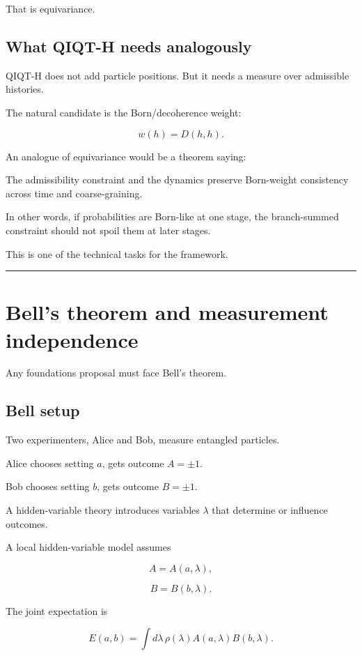 \documentclass[11pt,a4paper]{article}
\newenvironment{qiqtquote}{\begin{mdframed}[style=quotestyle]}{\end{mdframed}}
\begin{document}
That is equivariance.

\subsection{What QIQT-H needs analogously}

QIQT-H does not add particle positions. But it needs a measure over admissible histories.

The natural candidate is the Born/decoherence weight:

\[
w(h)=D(h,h).
\]

An analogue of equivariance would be a theorem saying:

\begin{qiqtquote}
The admissibility constraint and the dynamics preserve Born-weight consistency across time and coarse-graining.
\end{qiqtquote}

In other words, if probabilities are Born-like at one stage, the branch-summed constraint should not spoil them at later stages.

This is one of the technical tasks for the framework.

\medskip\hrule\medskip

\section{Bell’s theorem and measurement independence}

Any foundations proposal must face Bell’s theorem.

\subsection{Bell setup}

Two experimenters, Alice and Bob, measure entangled particles.

Alice chooses setting $a$, gets outcome $A=\pm1$.

Bob chooses setting $b$, gets outcome $B=\pm1$.

A hidden-variable theory introduces variables $\lambda$ that determine or influence outcomes.

A local hidden-variable model assumes

\[
A=A(a,\lambda),
\]

\[
B=B(b,\lambda).
\]

The joint expectation is

\[
E(a,b)=\int d\lambda\, \rho(\lambda) A(a,\lambda)B(b,\lambda).
\]
\end{document}
